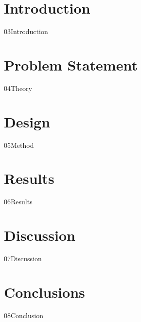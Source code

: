 \documentclass[a4paper, 12pt, openany]{book} %
\begin{document}

\chapter{Introduction}
{03Introduction}
\cleardoublepage


\chapter{Problem Statement}
{04Theory}
\cleardoublepage

\chapter{Design}
{05Method}
\cleardoublepage

\chapter{Results}
{06Results}
\cleardoublepage


\chapter{Discussion}
{07Discussion}
\cleardoublepage


\chapter{Conclusions}
{08Conclusion}
\cleardoublepage

\newpage
{}

\cleardoublepage

\renewcommand\chaptername{Appendix}
\renewcommand\thechapter{\Alph{chapter}}
\setcounter{chapter}{0}


\fancyhf{} %
\renewcommand{\headrulewidth}{0pt} %
\fancyfoot[C]{\thepage} %
\end{document}
